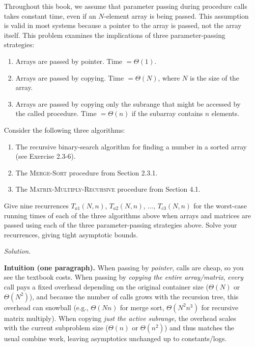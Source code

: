 \documentclass[12pt]{article}
\theoremstyle{definition}
\begin{document}
\medskip
Throughout this book, we assume that parameter passing during procedure calls takes constant time, even if an $N$-element array is being passed. This assumption is valid in most systems because a pointer to the array is passed, not the array itself. This problem examines the implications of three parameter-passing strategies:
\begin{enumerate}
\item Arrays are passed by pointer. Time $=\Theta(1)$.
\item Arrays are passed by copying. Time $=\Theta(N)$, where $N$ is the size of the array.
\item Arrays are passed by copying only the subrange that might be accessed by the called procedure. Time $=\Theta(n)$ if the subarray contains $n$ elements.
\end{enumerate}

Consider the following three algorithms:
\begin{enumerate}
\item The recursive binary-search algorithm for finding a number in a sorted array (see Exercise 2.3-6).
\item The \textsc{Merge-Sort} procedure from Section 2.3.1.
\item The \textsc{Matrix-Multiply-Recursive} procedure from Section 4.1.
\end{enumerate}

Give nine recurrences $T_{a1}(N,n)$, $T_{a2}(N,n)$, $\dots$, $T_{c3}(N,n)$ for the worst-case running times of each of the three algorithms above when arrays and matrices are passed using each of the three parameter-passing strategies above. Solve your recurrences, giving tight asymptotic bounds.

\medskip
\noindent\textit{Solution.}

\medskip
\noindent\textbf{Intuition (one paragraph).}
When passing by \emph{pointer}, calls are cheap, so you see the textbook costs. When passing by \emph{copying the entire array/matrix}, \emph{every} call pays a fixed overhead depending on the original container size ($\Theta(N)$ or $\Theta(N^2)$), and because the number of calls grows with the recursion tree, this overhead can snowball (e.g., $\Theta(Nn)$ for merge sort, $\Theta(N^2 n^3)$ for recursive matrix multiply). When copying \emph{just the active subrange}, the overhead scales with the current subproblem size ($\Theta(n)$ or $\Theta(n^2)$) and thus matches the usual combine work, leaving asymptotics unchanged up to constants/logs.
\end{document}

